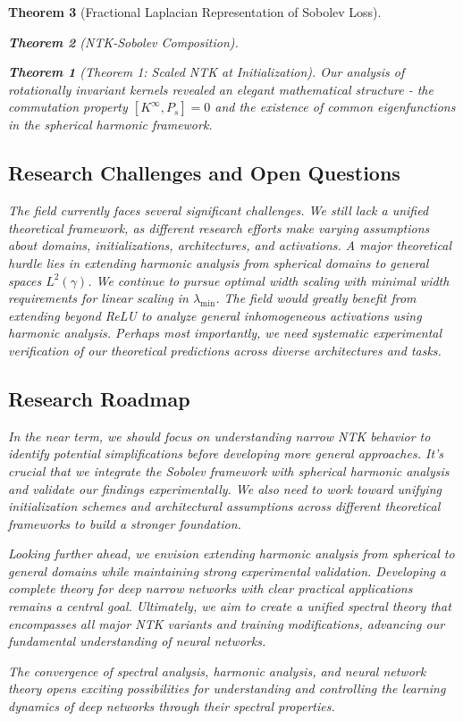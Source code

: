 \documentclass{article}
\newtheorem{theorem}{Theorem}[section]
\begin{document}
\begin{theorem}[Fractional Laplacian Representation of Sobolev Loss]
\begin{theorem}[NTK-Sobolev Composition]
\begin{theorem}[Theorem 1: Scaled NTK at Initialization]
Our analysis of rotationally invariant kernels revealed an elegant mathematical structure - the commutation property $[K^{\infty}, P_s] = 0$ and the existence of common eigenfunctions in the spherical harmonic framework.

\subsection{Research Challenges and Open Questions}

The field currently faces several significant challenges. We still lack a unified theoretical framework, as different research efforts make varying assumptions about domains, initializations, architectures, and activations. A major theoretical hurdle lies in extending harmonic analysis from spherical domains to general spaces $L^2(\gamma)$. We continue to pursue optimal width scaling with minimal width requirements for linear scaling in $\lambda_{\min}$. The field would greatly benefit from extending beyond ReLU to analyze general inhomogeneous activations using harmonic analysis. Perhaps most importantly, we need systematic experimental verification of our theoretical predictions across diverse architectures and tasks.

\subsection{Research Roadmap}

In the near term, we should focus on understanding narrow NTK behavior to identify potential simplifications before developing more general approaches. It's crucial that we integrate the Sobolev framework with spherical harmonic analysis and validate our findings experimentally. We also need to work toward unifying initialization schemes and architectural assumptions across different theoretical frameworks to build a stronger foundation.

Looking further ahead, we envision extending harmonic analysis from spherical to general domains while maintaining strong experimental validation. Developing a complete theory for deep narrow networks with clear practical applications remains a central goal. Ultimately, we aim to create a unified spectral theory that encompasses all major NTK variants and training modifications, advancing our fundamental understanding of neural networks.

The convergence of spectral analysis, harmonic analysis, and neural network theory opens exciting possibilities for understanding and controlling the learning dynamics of deep networks through their spectral properties.


\end{theorem}
\end{theorem}
\end{theorem}
\end{document}
